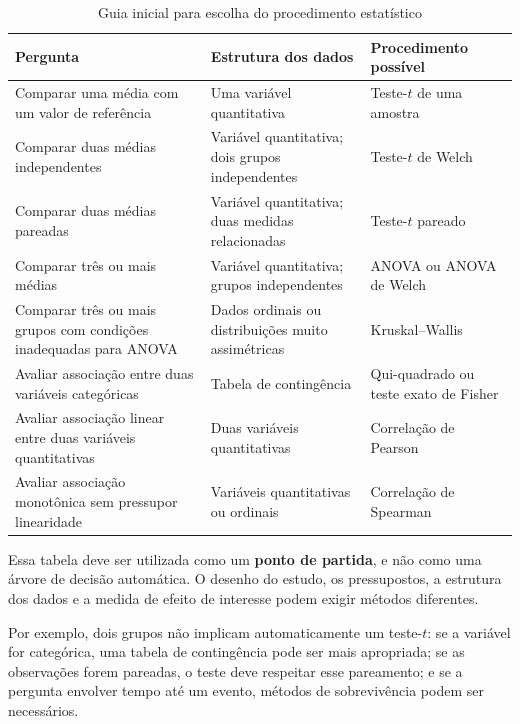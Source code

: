 \begin{table}[htbp]
\centering
\caption{Guia inicial para escolha do procedimento estatístico}
\label{tab:escolha_teste}
\vspace{2mm}

\begin{tabular}{p{4.2cm} p{4.0cm} p{4.5cm}}
\toprule
\textbf{Pergunta} &
\textbf{Estrutura dos dados} &
\textbf{Procedimento possível} \\
\midrule

Comparar uma média com um valor de referência &
Uma variável quantitativa &
Teste-$t$ de uma amostra \\

Comparar duas médias independentes &
Variável quantitativa; dois grupos independentes &
Teste-$t$ de Welch \\

Comparar duas médias pareadas &
Variável quantitativa; duas medidas relacionadas &
Teste-$t$ pareado \\

Comparar três ou mais médias &
Variável quantitativa; grupos independentes &
ANOVA ou ANOVA de Welch \\

Comparar três ou mais grupos com condições inadequadas para ANOVA &
Dados ordinais ou distribuições muito assimétricas &
Kruskal--Wallis \\

Avaliar associação entre duas variáveis categóricas &
Tabela de contingência &
Qui-quadrado ou teste exato de Fisher \\

Avaliar associação linear entre duas variáveis quantitativas &
Duas variáveis quantitativas &
Correlação de Pearson \\

Avaliar associação monotônica sem pressupor linearidade &
Variáveis quantitativas ou ordinais &
Correlação de Spearman \\

\bottomrule
\end{tabular}
\end{table}

Essa tabela deve ser utilizada como um \textbf{ponto de partida}, e não como
uma árvore de decisão automática. O desenho do estudo, os pressupostos, a
estrutura dos dados e a medida de efeito de interesse podem exigir métodos
diferentes.

Por exemplo, dois grupos não implicam automaticamente um teste-$t$:
se a variável for categórica, uma tabela de contingência pode ser mais
apropriada; se as observações forem pareadas, o teste deve respeitar esse
pareamento; e se a pergunta envolver tempo até um evento, métodos de
sobrevivência podem ser necessários.
